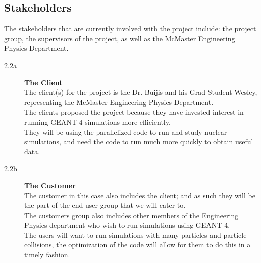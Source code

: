 \documentclass[12pt]{article}
\begin{document}
\subsection{Stakeholders} %
The stakeholders that are currently involved with the project include: the project group, the supervisors of the project, as well as the McMaster Engineering Physics Department.

\begin{description}
 	\item[2.2a] \textbf{The Client} \\
	The client(s) for the project is the Dr. Buijis and his Grad Student Wesley, representing the McMaster Engineering Physics Department.\\
	The clients proposed the project because they have invested interest in running GEANT-4 simulations more efficiently. \\
	They will be using the parallelized code to run and study nuclear simulations, and need the code to run much more quickly to 			obtain useful data. \\
	
  \item[2.2b] \textbf{The Customer} \\
	The customer in this case also includes the client; and as such they will be the part of the end-user group that we will cater to.\\
	The customers group also includes other members of the Engineering Physics department who wish to run simulations using GEANT-4. \\
	The users will want to run simulations with many particles and particle collisions, the optimization of the code will allow for 			them to do this in a timely fashion. \\	
	

\end{description}
\end{document}
